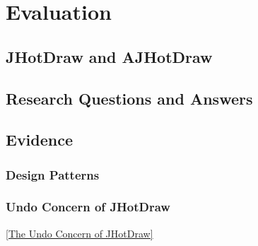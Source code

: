 \chapter{Evaluation}\label{Evaluation}

\section{JHotDraw and AJHotDraw}

\section{Research Questions and Answers}\label{Research Questions and Answers}

\section{Evidence}\label{Evidence}

\subsection{Design Patterns}\label{Design Patterns JHotDraw}

\subsection{Undo Concern of JHotDraw}\label{Undo JHotDraw}

\ref{The Undo Concern of JHotDraw}



